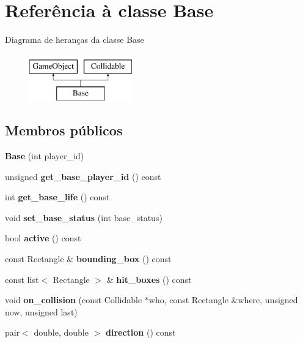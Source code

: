 \hypertarget{classBase}{}\section{Referência à classe Base}
\label{classBase}
Diagrama de heranças da classe Base\begin{figure}[H]
\begin{center}
\leavevmode
\includegraphics[height=2.000000cm]{classBase}
\end{center}
\end{figure}
\subsection*{Membros públicos}
\begin{DoxyCompactItemize}
\item 
\mbox{\label{classBase_af39d4ba491dea383a8250c6d58919f21}} 
{\bfseries Base} (int player\+\_\+id)
\item 
\mbox{\label{classBase_abee4a445acdcde63608940348feedd0d}} 
unsigned {\bfseries get\+\_\+base\+\_\+player\+\_\+id} () const
\item 
\mbox{\label{classBase_a58a549391a91d1b0062a9d8955d26172}} 
int {\bfseries get\+\_\+base\+\_\+life} () const
\item 
\mbox{\label{classBase_a580dc7cdb6ff87350d04d494616839ea}} 
void {\bfseries set\+\_\+base\+\_\+status} (int base\+\_\+status)
\item 
\mbox{\label{classBase_abc6031bf03072e10f4d8635dd226b01c}} 
bool {\bfseries active} () const
\item 
\mbox{\label{classBase_a28fbf5f8b4e7e774f47298b76268159f}} 
const Rectangle \& {\bfseries bounding\+\_\+box} () const
\item 
\mbox{\label{classBase_a378997fa37a9d46f5c8fb02b090da00d}} 
const list$<$ Rectangle $>$ \& {\bfseries hit\+\_\+boxes} () const
\item 
\mbox{\label{classBase_aacfcf7a911c60d8718219d45f8422449}} 
void {\bfseries on\+\_\+collision} (const Collidable $\ast$who, const Rectangle \&where, unsigned now, unsigned last)
\item 
\mbox{\label{classBase_a77dceab1d1d47769ab4072c18d8fe473}} 
pair$<$ double, double $>$ {\bfseries direction} () const
\end{DoxyCompactItemize}
